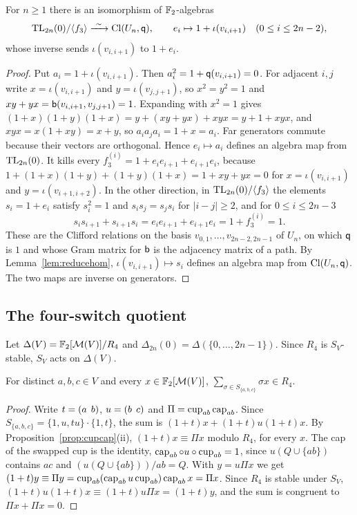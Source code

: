 \begin{theorem}\label{thm:tlcl}
For $n\ge1$ there is an isomorphism of $\mathbb{F}_2$-algebras
\[
\TL_{2n}(0)/\pr{f_3}\xrightarrow{\ \sim\ }\Cl(U_n,\qf),\qquad e_i\mapsto1+\iota(v_{i,i+1})\quad(0\le i\le2n-2),
\]
whose inverse sends $\iota(v_{i,i+1})$ to $1+e_i$.
\end{theorem}

\begin{proof}
Put $a_i=1+\iota(v_{i,i+1})$. Then $a_i^2=1+\mathsf{q}(v_{i,i+1})=0$. For adjacent $i,j$ write $x=\iota(v_{i,i+1})$ and $y=\iota(v_{j,j+1})$, so $x^2=y^2=1$ and $xy+yx=\mathsf{b}(v_{i,i+1},v_{j,j+1})=1$. Expanding with $x^2=1$ gives $(1+x)(1+y)(1+x)=y+(xy+yx)+xyx=y+1+xyx$, and $xyx=x(1+xy)=x+y$, so $a_{i}a_{j}a_i=1+x=a_i$. Far generators commute because their vectors are orthogonal. Hence $e_i\mapsto a_i$ defines an algebra map from $\mathrm{TL}_{2n}(0)$. It kills every $f_3^{(i)}=1+e_{i}e_{i+1}+e_{i+1}e_i$, because $1+(1+x)(1+y)+(1+y)(1+x)=1+xy+yx=0$ for $x=\iota(v_{i,i+1})$ and $y=\iota(v_{i+1,i+2})$. In the other direction, in $\mathrm{TL}_{2n}(0)/\langle f_3\rangle$ the elements $s_i=1+e_i$ satisfy $s_i^2=1$ and $s_{i}s_j=s_{j}s_i$ for $|i-j|\ge2$, and for $0\le i\le2n-3$
\[
s_{i}s_{i+1}+s_{i+1}s_i=e_{i}e_{i+1}+e_{i+1}e_i=1+f_3^{(i)}=1 .
\]
These are the Clifford relations on the basis $v_{0,1},\dots,v_{2n-2,2n-1}$ of $U_n$, on which $\mathsf{q}$ is $1$ and whose Gram matrix for $\mathsf{b}$ is the adjacency matrix of a path. By Lemma~\ref{lem:reducehom}, $\iota(v_{i,i+1})\mapsto s_i$ defines an algebra map from $\operatorname{Cl}(U_n,\mathsf{q})$. The two maps are inverse on generators.
\end{proof}

\subsection{The four-switch quotient}

Let $\Delta(V)=\mathbb{F}_2[\mathcal{M}(V)]/R_4$ and $\Delta_{2n}(0)=\Delta(\{0,\dots,2n-1\})$. Since $R_4$ is $S_V$-stable, $S_V$ acts on $\Delta(V)$.

\begin{lemma}\label{lem:sym3}
For distinct $a,b,c\in V$ and every $x\in\mathbb{F}_2[\mathcal{M}(V)]$, $\sum_{\sigma\in S_{\{a,b,c\}}}\sigma x\in R_4$.
\end{lemma}

\begin{proof}
Write $t=(a\;\,b)$, $u=(b\;\,c)$ and $\Pi=\operatorname{cup}_{ab}\operatorname{cap}_{ab}$. Since $S_{\{a,b,c\}}=\{1,u,tu\}\cdot\{1,t\}$, the sum is $(1+t)x+(1+t)u(1+t)x$. By Proposition~\ref{prop:cupcap}(ii), $(1+t)x\equiv\Pi x$ modulo $R_4$, for every $x$. The cap of the swapped cup is the identity, $\operatorname{cap}_{ab}\circ u\circ\operatorname{cup}_{ab}=1$, since $u(Q\cup\{ab\})$ contains $ac$ and $(u(Q\cup\{ab\}))/ab=Q$. With $y=u\Pi x$ we get $(1+t)y\equiv\Pi y=\operatorname{cup}_{ab}(\operatorname{cap}_{ab}u\operatorname{cup}_{ab})\operatorname{cap}_{ab}x=\Pi x$. Since $R_4$ is stable under $S_V$, $(1+t)u(1+t)x\equiv(1+t)u\Pi x=(1+t)y$, and the sum is congruent to $\Pi x+\Pi x=0$.
\end{proof}


